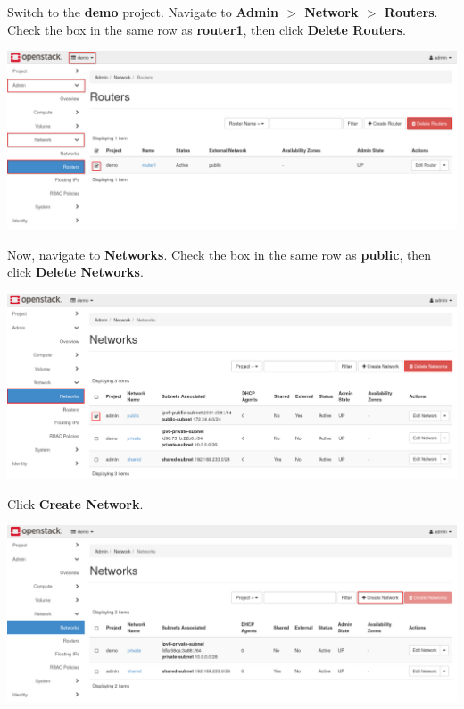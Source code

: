 \documentclass[letterpaper, 12pt]{article}
\begin{document}
\begin{enumerate}
    \begin{labstep}
        Switch to the \textbf{demo} project.
        Navigate to \textbf{Admin $>$ Network $>$ Routers}.
        Check the box in the same row as \textbf{router1}, then click \textbf{Delete Routers}.

        \begin{center}
            \includegraphics[width=\linewidth]{images/part1/step4.png}
        \end{center}
    \end{labstep}

    \begin{labstep}
        Now, navigate to \textbf{Networks}.
        Check the box in the same row as \textbf{public}, then click
        \textbf{Delete Networks}.

        \begin{center}
            \includegraphics[width=\linewidth]{images/part1/step5.png}
        \end{center}
    \end{labstep}

    \begin{labstep}
        Click \textbf{Create Network}.

        \begin{center}
            \includegraphics[width=\linewidth]{images/part1/step6.png}
        \end{center}
    \end{labstep}


\end{enumerate}
\end{document}
